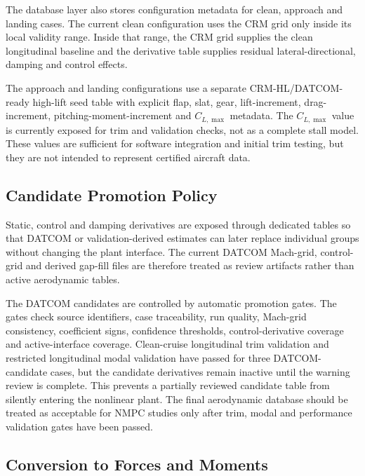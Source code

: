 The database layer also stores configuration metadata for clean, approach and
landing cases. The current clean configuration uses the CRM grid only inside
its local validity range. Inside that range, the CRM grid supplies the clean
longitudinal baseline and the derivative table supplies residual
lateral-directional, damping and control effects.

The approach and landing configurations use a separate CRM-HL/DATCOM-ready
high-lift seed table with explicit flap, slat, gear, lift-increment,
drag-increment, pitching-moment-increment and $C_{L,\max}$ metadata. The
$C_{L,\max}$ value is currently exposed for trim and validation checks, not as
a complete stall model. These values are sufficient for software integration
and initial trim testing, but they are not intended to represent certified
aircraft data.

\subsection{Candidate Promotion Policy}

Static, control and damping derivatives are exposed through dedicated tables so
that DATCOM or validation-derived estimates can later replace individual groups
without changing the plant interface. The current DATCOM Mach-grid,
control-grid and derived gap-fill files are therefore treated as review
artifacts rather than active aerodynamic tables.

The DATCOM candidates are controlled by automatic promotion gates. The gates
check source identifiers, case traceability, run quality, Mach-grid
consistency, coefficient signs, confidence thresholds, control-derivative
coverage and active-interface coverage. Clean-cruise longitudinal trim
validation and restricted longitudinal modal validation have passed for three
DATCOM-candidate cases, but the candidate derivatives remain inactive until the
warning review is complete. This prevents a partially reviewed candidate table
from silently entering the nonlinear plant. The final aerodynamic database
should be treated as acceptable for NMPC studies only after trim, modal and
performance validation gates have been passed.

\subsection{Conversion to Forces and Moments}

